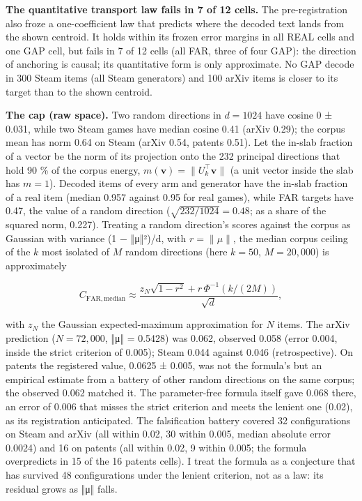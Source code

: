 \documentclass[
  10pt,
]{article}
\begin{document}
\textbf{The quantitative transport law
fails in 7 of 12 cells.} The
pre-registration also froze a
one-coefficient law that predicts where
the decoded text lands from the shown
centroid. It holds within its frozen
error margins in all REAL cells and one
GAP cell, but fails in 7 of 12 cells
(all FAR, three of four GAP): the
direction of anchoring is causal; its
quantitative form is only approximate.
No GAP decode in 300 Steam items (all
Steam generators) and 100 arXiv items is
closer to its target than to the shown
centroid.

\textbf{The cap (raw space).} Two random
directions in \(d = 1024\) have cosine 0
± 0.031, while two Steam games have
median cosine 0.41 (arXiv 0.29); the
corpus mean has norm 0.64 on Steam
(arXiv 0.54, patents 0.51). Let the
in-slab fraction of a vector be the norm
of its projection onto the 232 principal
directions that hold 90 \% of the corpus
energy, \(m(\mathbf{v}) = \|U_k^\top
\mathbf{v}\|\) (a unit vector inside the
slab has \(m = 1\)). Decoded items of
every arm and generator have the in-slab
fraction of a real item (median 0.957
against 0.95 for real games), while FAR
targets have 0.47, the value of a random
direction (\(\sqrt{232/1024} = 0.48\);
as a share of the squared norm, 0.227).
Treating a random direction's scores
against the corpus as Gaussian with
variance (1 − ‖μ‖²)/d, with
\(r = \|\mu\|\), the median corpus
ceiling of the \(k\) most isolated of
\(M\) random directions (here
\(k = 50\), \(M = 20{,}000\)) is
approximately

\[ C_{\mathrm{FAR,median}} \approx \frac{z_N \sqrt{1 - r^2} + r\,\Phi^{-1}\!\left(k/(2M)\right)}{\sqrt d}, \]

with \(z_N\) the Gaussian
expected-maximum approximation for \(N\)
items. The arXiv prediction
(\(N = 72{,}000\), ‖μ‖ = 0.5428) was
0.062, observed 0.058 (error 0.004,
inside the strict criterion of 0.005);
Steam 0.044 against 0.046
(retrospective). On patents the
registered value, 0.0625 ± 0.005, was
not the formula's but an empirical
estimate from a battery of other random
directions on the same corpus; the
observed 0.062 matched it. The
parameter-free formula itself gave 0.068
there, an error of 0.006 that misses the
strict criterion and meets the lenient
one (0.02), as its registration
anticipated. The falsification battery
covered 32 configurations on Steam and
arXiv (all within 0.02, 30 within 0.005,
median absolute error 0.0024) and 16 on
patents (all within 0.02, 9 within
0.005; the formula overpredicts in 15 of
the 16 patents cells). I treat the
formula as a conjecture that has
survived 48 configurations under the
lenient criterion, not as a law: its
residual grows as ‖μ‖ falls.
\end{document}
